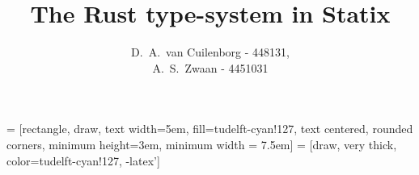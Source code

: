 \documentclass[sigplan,screen]{acmart}
\title{The Rust type-system in Statix}
\author{
D.\ A.\ van Cuilenborg - 448131,\\
A.\ S.\ Zwaan - 4451031}
\begin{document}
\renewcommand{\sectionautorefname}{Section}
\renewcommand{\chapterautorefname}{Chapter}
\let\subsectionautorefname\sectionautorefname
\let\subsubsectionautorefname\sectionautorefname

\newcommand{\lowspacingitem}[0]{\itemsep0.2em}


\newcommand{\nl}[0]{\bigbreak

}

 = [rectangle, draw, text width=5em, fill=tudelft-cyan!127, text centered, rounded corners, minimum height=3em, minimum width = 7.5em]
 = [draw, very thick, color=tudelft-cyan!127, -latex']

%

\maketitle









\end{document}

